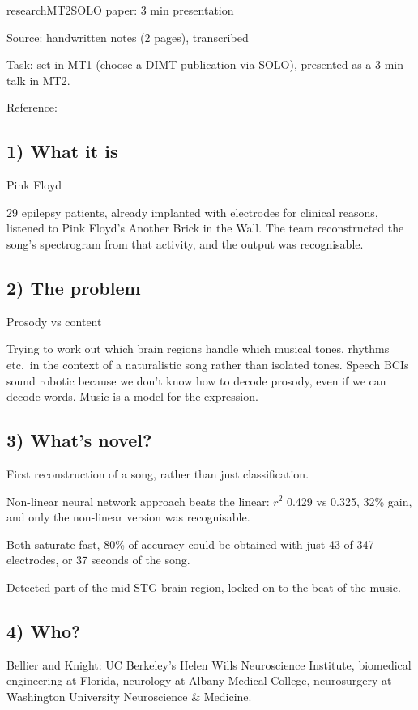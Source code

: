 \begin{entry}{research}{MT2}{SOLO paper: 3 min presentation}

Source: handwritten notes (2 pages), transcribed

Task: set in MT1 (choose a DIMT publication via SOLO), presented as a 3-min talk in MT2.

Reference: 
\nocite{Bellier2023}

\subsection*{1) What it is}
Pink Floyd

29 epilepsy patients, already implanted with electrodes for clinical reasons, listened to Pink Floyd's Another Brick in the Wall. The team reconstructed the song's spectrogram from that activity, and the output was recognisable.

\subsection*{2) The problem}
Prosody vs content

Trying to work out which brain regions handle which musical tones, rhythms etc.\ in the context of a naturalistic song rather than isolated tones. Speech BCIs sound robotic because we don't know how to decode prosody, even if we can decode words. Music is a model for the expression.

\subsection*{3) What's novel?}
First reconstruction of a song, rather than just classification.

Non-linear neural network approach beats the linear: $r^2$ 0.429 vs 0.325, 32\% gain, and only the non-linear version was recognisable.

Both saturate fast, 80\% of accuracy could be obtained with just 43 of 347 electrodes, or 37 seconds of the song.

Detected part of the mid-STG brain region, locked on to the beat of the music.

\subsection*{4) Who?}
Bellier and Knight: UC Berkeley's Helen Wills Neuroscience Institute, biomedical engineering at Florida, neurology at Albany Medical College, neurosurgery at Washington University Neuroscience \& Medicine.


\end{entry}
